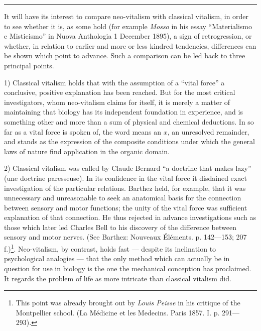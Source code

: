 \documentclass[12pt,a4paper,openany]{book}
\newcommand{\opage}[1]{\marginnote{\footnotesize\textit{[#1]}}}
\newcommand{\streg}{\begin{center}\rule{3em}{0.4pt}\end{center}}
\begin{document}
\streg{}

It will have its interest to compare neo-vitalism with classical vitalism, in
order to see whether it is, as some hold (for example \emph{Mosso} in his essay
``Materialismo e Misticismo'' in Nuova Anthologia 1 December 1895), a sign of
retrogression, or whether, in relation to earlier and more or less kindred
tendencies, differences can be shown which point to advance. Such a comparison
can be led back to three principal points.

1) Classical vitalism holds that with the assumption of a ``vital force'' a
conclusive, positive explanation has been reached. But for the most critical
investigators, whom neo-vitalism claims
\opage{47}for itself, it is merely a matter of maintaining that biology has its independent
foundation in experience, and is something other and more than a sum of physical and chemical
deductions. In so far as a vital force is spoken of, the word means an $x$, an
unresolved remainder, and stands as the expression of the composite conditions
under which the general laws of nature find application in the organic domain.

2) Classical vitalism was called by Claude Bernard ``a doctrine that makes
lazy'' (une doctrine paresseuse). In its confidence in the vital force
it disdained exact investigation of the particular relations. Barthez held, for
example, that it was unnecessary and unreasonable to seek an anatomical basis
for the connection between sensory and motor functions; the unity of the vital
force was sufficient explanation of that connection. He thus rejected in advance
investigations such as those which later led Charles Bell to his discovery of
the difference between sensory and motor nerves. (See Barthez: Nouveaux
Éléments. p. 142---153; 207 f.)\footnote{This point was already brought out by
\emph{Louis Peisse} in his critique of the Montpellier school. (La
Médicine et les Medecins. Paris 1857. I. p. 291---293).}. Neo-vitalism,
by contrast, holds fast --- despite its inclination to psychological analogies ---
that the only method which can actually be in question for use in biology is the
one the mechanical conception has proclaimed. It regards the problem of life as
more intricate than classical vitalism did.
\end{document}
